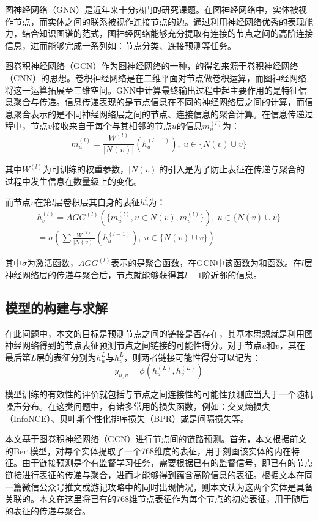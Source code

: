 \documentclass[bwprint]{gmcmthesis}
\begin{document}
图神经网络（GNN）是近年来十分热门的研究课题。在图神经网络中，实体被视作节点，而实体之间的联系被视作连接节点的边。通过利用神经网络优秀的表现能力，结合知识图谱的范式，图神经网络能够充分提取有连接的节点之间的高阶连接信息，进而能够完成一系列如：节点分类、连接预测等任务。

图卷积神经网络（GCN）作为图神经网络的一种，的得名来源于卷积神经网络（CNN）的思想。卷积神经网络是在二维平面对节点做卷积运算，而图神经网络将这一运算拓展至三维空间。GNN中计算最终输出过程中起主要作用的是特征信息聚合与传递。信息传递表现的是节点信息在不同的神经网络层之间的计算，而信息聚合表示的是不同神经网络层之间的节点、连接信息的聚合计算。在信息传递过程中，节点$v$接收来自于每个与其相邻的节点$u$的信息$m_{u}^{(l)}$为：
\begin{equation}
  m_{u}^{(l)} = \frac{W^{(l)}}{|N(v)|}(h_u^{(l-1)}), \ u \in \{N(v) \cup v\}
\end{equation}

其中$W^{(l)}$为可训练的权重参数，$|N(v)|$的引入是为了防止表征在传递与聚合的过程中发生信息在数量级上的变化。

而节点$v$在第$l$层卷积层其自身的表征$h_v^{l}$为：
\begin{gather}
	h_{v}^{(l)} = AGG^{(l)}(\{m_u^{(l)}, u \in N(v), m_v^{(l)}\}), \ u \in \{N(v) \cup v\} \\ 
	= \sigma(\sum \frac{W^{(l)}}{|N(v)|}(h_u^{(l-1)}), \ u \in \{N(v) \cup v\})
\end{gather}

其中$\sigma$为激活函数，$AGG^{(l)}$表示的是聚合函数，在GCN中该函数为和函数。在$l$层神经网络层的传递与聚合后，节点就能够获得其$l-1$阶近邻的信息。

\subsection{模型的构建与求解}

在此问题中，本文的目标是预测节点之间的链接是否存在，其基本思想就是利用图神经网络得到的节点表征预测节点之间链接的可能性得分。对于节点$u$和$v$，其在最后第$L$层的表征分别为$h_u^{L}$与$h_v^{L}$，则两者链接可能性得分可以记为：
\begin{equation}
	y_{u, v} = \phi(h_u^{(L)}, h_v^{(L)})
\end{equation}

模型训练的有效性的评价就包括与节点之间连接性的可能性预测应当大于一个随机噪声分布。在这类问题中，有诸多常用的损失函数，例如：交叉熵损失（InfoNCE）、贝叶斯个性化排序损失（BPR）或是间隔损失等。

本文基于图卷积神经网络（GCN）进行节点间的链路预测。首先，本文根据前文的Bert模型，对每个实体提取了一个768维度的表征，用于刻画该实体的内在特征。由于链接预测是个有监督学习任务，需要根据已有的监督信号，即已有的节点链接进行表征的传递与聚合，进而才能够得到蕴含高阶信息的表征。根据文本在同一篇微信公众号推文或游记攻略中的同时出现情况，则本文认为这两个实体是具备关联的。本文在这里将已有的768维节点表征作为每个节点的初始表征，用于随后的表征的传递与聚合。
\end{document}
